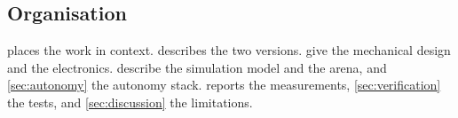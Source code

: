 \subsection{Organisation}
 places the work in context.  describes the two
versions.  give the mechanical design and the
electronics.  describe the simulation model and the arena,
and \cref{sec:autonomy} the autonomy stack.  reports the measurements,
\cref{sec:verification} the tests, and \cref{sec:discussion} the limitations.
